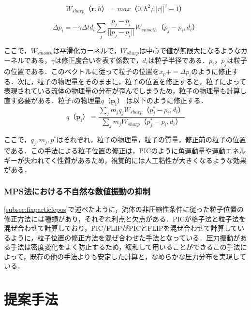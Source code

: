 \documentclass[a4j,12pt]{jreport}
\begin{document}
\begin{equation}\label{eq:w_sharp}
W_{sharp}（\bm{r},h） = max（0,h^2/||r||^2 - 1）
\end{equation} 

\begin{equation}\label{eq:fixVector}
\varDelta p_i = -\gamma \varDelta td_i\sum\limits_j \frac{p_j - p_i}{||p_j - p_i||}W_{smooth}（p_j - p_i,d_i）
\end{equation} 

ここで，$W_{smooth}$は平滑化カーネルで，$W_{sharp}$は中心で値が無限大になるようなカーネルである，$\gamma$は修正度合いを表す係数で，$d_i$は粒子半径である．$p_i$，$p_j$は粒子の位置である．このベクトルに従って粒子の位置を$x_p += \varDelta p_i$のように修正する．次に，粒子の物理量をそのままに，粒子の位置を修正すると，粒子によって表現されている流体の物理量の分布が歪んでしまうため，粒子の物理量も計算し直す必要がある．粒子$i$の物理量$q（\bm{p_i}）$ は以下のように修正する．
\begin{equation}\label{eq:fixVelocity}
q（\bm{p_i}） = \frac{\sum\limits_j m_jq_jW_{sharp}（p^*_j - p_i,d_i）}{\sum\limits_j m_jW_{sharp}（p^*_j - p_i,d_i）}
\end{equation} 

ここで，$q_j,m_j,p^*$はそれぞれ，粒子の物理量，粒子の質量，修正前の粒子の位置である．この手法による粒子位置の修正は，PICのように角運動量や運動エネルギーが失われてく性質があるため，視覚的には人工粘性が大きくなるような効果がある．
\subsection{MPS法における不自然な数値振動の抑制}\label{subsec:japan}
\ref{subsec:fixparticlepos}で述べたように，流体の非圧縮性条件に従った粒子位置の修正方法には種類があり，それぞれ利点と欠点がある．PICが格子法と粒子法を混ぜ合わせて計算しており，PIC/FLIPがPICとFLIPを混ぜ合わせて計算しているように，粒子位置の修正方法を混ぜ合わせた手法となっている．圧力振動がある手法は密度変化をよく防止するため，緩和して用いることができるこの手法によって，既存の他の手法よりも安定した計算と，なめらかな圧力分布を実現している．
\chapter{提案手法} \label{chapter:4}
\end{document}
